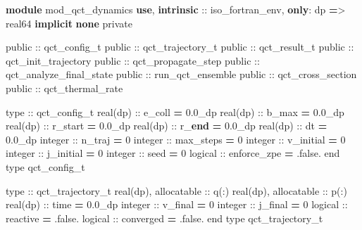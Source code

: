\documentclass[
]{ctexbook}
\newenvironment{Shaded}{}{}
\newcommand{\ConstantTok}[1]{\textcolor[rgb]{0.53,0.00,0.00}{#1}}
\newcommand{\DataTypeTok}[1]{\textcolor[rgb]{0.56,0.13,0.00}{#1}}
\newcommand{\DecValTok}[1]{\textcolor[rgb]{0.25,0.63,0.44}{#1}}
\newcommand{\FloatTok}[1]{\textcolor[rgb]{0.25,0.63,0.44}{#1}}
\newcommand{\KeywordTok}[1]{\textcolor[rgb]{0.00,0.44,0.13}{\textbf{#1}}}
\newcommand{\NormalTok}[1]{#1}
\newcommand{\OperatorTok}[1]{\textcolor[rgb]{0.40,0.40,0.40}{#1}}
\begin{document}
\begin{Shaded}
\begin{Highlighting}[]
\KeywordTok{module}\NormalTok{ mod\_qct\_dynamics}
    \KeywordTok{use}\NormalTok{, }\KeywordTok{intrinsic} \DataTypeTok{::}\NormalTok{ iso\_fortran\_env, }\KeywordTok{only}\NormalTok{: dp }\KeywordTok{=}\OperatorTok{\textgreater{}}\NormalTok{ real64}
    \KeywordTok{implicit} \KeywordTok{none}
    \DataTypeTok{private}

    \DataTypeTok{public} \DataTypeTok{::}\NormalTok{ qct\_config\_t}
    \DataTypeTok{public} \DataTypeTok{::}\NormalTok{ qct\_trajectory\_t}
    \DataTypeTok{public} \DataTypeTok{::}\NormalTok{ qct\_result\_t}
    \DataTypeTok{public} \DataTypeTok{::}\NormalTok{ qct\_init\_trajectory}
    \DataTypeTok{public} \DataTypeTok{::}\NormalTok{ qct\_propagate\_step}
    \DataTypeTok{public} \DataTypeTok{::}\NormalTok{ qct\_analyze\_final\_state}
    \DataTypeTok{public} \DataTypeTok{::}\NormalTok{ run\_qct\_ensemble}
    \DataTypeTok{public} \DataTypeTok{::}\NormalTok{ qct\_cross\_section}
    \DataTypeTok{public} \DataTypeTok{::}\NormalTok{ qct\_thermal\_rate}

    \DataTypeTok{type} \DataTypeTok{::}\NormalTok{ qct\_config\_t}
\DataTypeTok{        real(dp)} \DataTypeTok{::}\NormalTok{ e\_coll }\KeywordTok{=} \FloatTok{0.0\_dp}
\DataTypeTok{        real(dp)} \DataTypeTok{::}\NormalTok{ b\_max }\KeywordTok{=} \FloatTok{0.0\_dp}
\DataTypeTok{        real(dp)} \DataTypeTok{::}\NormalTok{ r\_start }\KeywordTok{=} \FloatTok{0.0\_dp}
\DataTypeTok{        real(dp)} \DataTypeTok{::}\NormalTok{ r\_}\KeywordTok{end} \KeywordTok{=} \FloatTok{0.0\_dp}
\DataTypeTok{        real(dp)} \DataTypeTok{::}\NormalTok{ dt }\KeywordTok{=} \FloatTok{0.0\_dp}
        \DataTypeTok{integer}  \DataTypeTok{::}\NormalTok{ n\_traj }\KeywordTok{=} \DecValTok{0}
        \DataTypeTok{integer}  \DataTypeTok{::}\NormalTok{ max\_steps }\KeywordTok{=} \DecValTok{0}
        \DataTypeTok{integer}  \DataTypeTok{::}\NormalTok{ v\_initial }\KeywordTok{=} \DecValTok{0}
        \DataTypeTok{integer}  \DataTypeTok{::}\NormalTok{ j\_initial }\KeywordTok{=} \DecValTok{0}
        \DataTypeTok{integer}  \DataTypeTok{::}\NormalTok{ seed }\KeywordTok{=} \DecValTok{0}
        \DataTypeTok{logical}  \DataTypeTok{::}\NormalTok{ enforce\_zpe }\KeywordTok{=} \ConstantTok{.false.}
    \DataTypeTok{end type}\NormalTok{ qct\_config\_t}

    \DataTypeTok{type} \DataTypeTok{::}\NormalTok{ qct\_trajectory\_t}
\DataTypeTok{        real(dp)}\NormalTok{, }\DataTypeTok{allocatable} \DataTypeTok{::}\NormalTok{ q(:)}
\DataTypeTok{        real(dp)}\NormalTok{, }\DataTypeTok{allocatable} \DataTypeTok{::}\NormalTok{ p(:)}
\DataTypeTok{        real(dp)} \DataTypeTok{::}\NormalTok{ time }\KeywordTok{=} \FloatTok{0.0\_dp}
        \DataTypeTok{integer}  \DataTypeTok{::}\NormalTok{ v\_final }\KeywordTok{=} \DecValTok{0}
        \DataTypeTok{integer}  \DataTypeTok{::}\NormalTok{ j\_final }\KeywordTok{=} \DecValTok{0}
        \DataTypeTok{logical}  \DataTypeTok{::}\NormalTok{ reactive }\KeywordTok{=} \ConstantTok{.false.}
        \DataTypeTok{logical}  \DataTypeTok{::}\NormalTok{ converged }\KeywordTok{=} \ConstantTok{.false.}
    \DataTypeTok{end type}\NormalTok{ qct\_trajectory\_t}


\end{Highlighting}
\end{Shaded}
\end{document}
